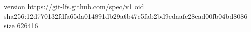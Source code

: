 version https://git-lfs.github.com/spec/v1
oid sha256:12d770132fdfa65da014891db29a6b47c5fab2bd9edaafc28ead00fb04bd8086
size 626416
